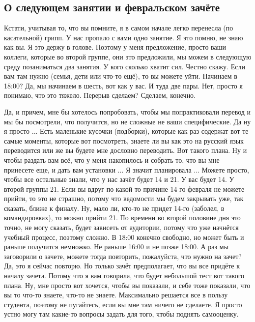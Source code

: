 \documentclass[main.tex]{subfiles}
\begin{document}
\subsection{О следующем занятии и февральском зачёте}

Кстати, учитывая то, что вы помните, я в самом начале легко перенесла (по касательной) грипп.
У нас пропало с вами одно занятие.
Я это помню, не знаю как вы.
Я это держу в голове.
Поэтому у меня предложение, просто ваши коллеги, которые во второй группе, они это предложили, мы можем в следующую среду позаниматься два занятия.
У кого сколько хватит сил.
Честно скажу.
Если вам там нужно (семья, дети или что-то ещё), то вы можете уйти.
Начинаем в 18:00?
Да, мы начинаем в шесть, вот как у вас.
И туда две пары.
Нет, просто я понимаю, что это тяжело.
Перерыв сделаем?
Сделаем, конечно.

Да, и причем, мне бы хотелось попробовать, чтобы мы попрактиковали перевод и мы бы посмотрели, что получится, но не сложные не ваши специфические.
Да ну я просто ...
Есть маленькие кусочки (подборки), которые как раз содержат вот те самые моменты, которые вот посмотреть, знаете ли вы как это на русский язык переводится или же вы будете мне дословно переводить.
Вот такого плана.
Ну и чтобы раздать вам всё, что у меня накопилось и собрать то, что вы мне принесете еще, и дать вам установки ...
Я значит планировала ...
Можете просто, чтобы все остальные знали, что у нас зачёт будет 14 и 21.
У вас будет 14.
У второй группы 21.
Если вы вдруг по какой-то причине 14-го февраля не можете прийти, то это не страшно, потому что ведомости мы будем закрывать уже, так сказать, ближе к финалу.
Ну, мало ли, кто-то не придет 14-го (заболел, в командировках), то можно прийти 21.
По времени во второй половине дня это точно, не могу сказать, будет зависеть от аудитории, потому что уже начнётся учебный процесс, поэтому сложно.
В 18:00 конечно свободно, но может быть и раньше получится немножко.
Не раньше 16:00 и не позже 18:00.
А раз мы заговорили о зачете, можете тогда повторить, пожалуйста, что нужно на зачет?
Да, это я сейчас повторю.
Но только зачёт предполагает, что вы все придёте к началу зачета.
Потому что я вам говорила, что будет небольшой тест вот такого плана.
Ну, мне просто вот хочется, чтобы вы показали, и себе тоже показали, что вы то что-то знаете, что-то не знаете.
Максимально решается все в пользу студента, поэтому не пугайтесь, если вы мне там ничего не сделаете.
Я просто устно могу там какие-то вопросы задать для того, чтобы поднять самооценку.
\end{document}
